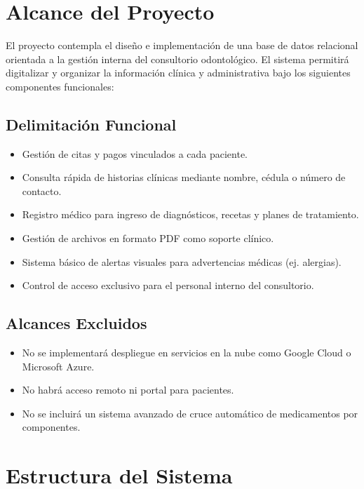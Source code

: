\documentclass[conference]{IEEEtran}
\begin{document}
\section{Alcance del Proyecto}

El proyecto contempla el diseño e implementación de una base de datos relacional orientada a la gestión interna del consultorio odontológico. El sistema permitirá digitalizar y organizar la información clínica y administrativa bajo los siguientes componentes funcionales:

\subsection{Delimitación Funcional}

\begin{itemize}
    \item Gestión de citas y pagos vinculados a cada paciente.
    \item Consulta rápida de historias clínicas mediante nombre, cédula o número de contacto.
    \item Registro médico para ingreso de diagnósticos, recetas y planes de tratamiento.
    \item Gestión de archivos en formato PDF como soporte clínico.
    \item Sistema básico de alertas visuales para advertencias médicas (ej. alergias).
    \item Control de acceso exclusivo para el personal interno del consultorio.
\end{itemize}

\subsection{Alcances Excluidos}

\begin{itemize}
    \item No se implementará despliegue en servicios en la nube como Google Cloud o Microsoft Azure.
    \item No habrá acceso remoto ni portal para pacientes.
    \item No se incluirá un sistema avanzado de cruce automático de medicamentos por componentes.
\end{itemize}

\section{Estructura del Sistema}
\end{document}

